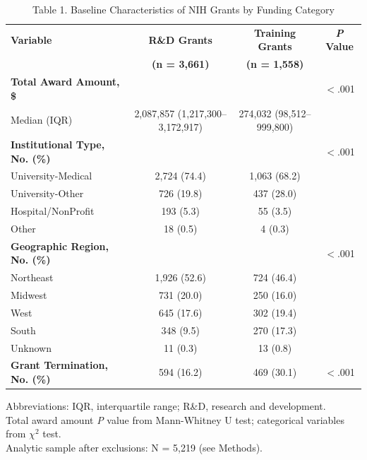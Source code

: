 \begin{table}[htbp]
\centering
\caption{Table 1. Baseline Characteristics of NIH Grants by Funding Category}
\label{tab:table1}
\small
\begin{tabular}{@{}lccc@{}}
\toprule
\textbf{Variable} & \textbf{R\&D Grants} & \textbf{Training Grants} & \textbf{\textit{P} Value} \\
 & \textbf{(n = 3,661)} & \textbf{(n = 1,558)} & \\
\midrule
\textbf{Total Award Amount, \$} & & & $<$.001 \\
\quad Median (IQR) & 2,087,857 (1,217,300–3,172,917) & 274,032 (98,512–999,800) & \\
\addlinespace
\textbf{Institutional Type, No. (\%)} & & & $<$.001 \\
\quad University-Medical & 2,724 (74.4) & 1,063 (68.2) & \\
\quad University-Other & 726 (19.8) & 437 (28.0) & \\
\quad Hospital/NonProfit & 193 (5.3) & 55 (3.5) & \\
\quad Other & 18 (0.5) & 4 (0.3) & \\
\addlinespace
\textbf{Geographic Region, No. (\%)} & & & $<$.001 \\
\quad Northeast & 1,926 (52.6) & 724 (46.4) & \\
\quad Midwest & 731 (20.0) & 250 (16.0) & \\
\quad West & 645 (17.6) & 302 (19.4) & \\
\quad South & 348 (9.5) & 270 (17.3) & \\
\quad Unknown & 11 (0.3) & 13 (0.8) & \\
\addlinespace
\textbf{Grant Termination, No. (\%)} & 594 (16.2) & 469 (30.1) & $<$.001 \\
\bottomrule
\end{tabular}
\begin{flushleft}
\footnotesize Abbreviations: IQR, interquartile range; R\&D, research and development. \\
Total award amount \textit{P} value from Mann-Whitney U test; categorical variables from $\chi^2$ test. \\
Analytic sample after exclusions: N = 5,219 (see Methods).
\end{flushleft}
\end{table}
